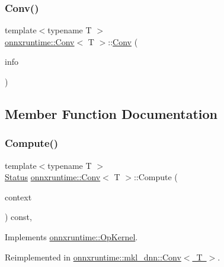 \subsubsection{\texorpdfstring{Conv()}{Conv()}}
{\footnotesize\ttfamily template$<$typename T $>$ \\
\mbox{\hyperlink{classonnxruntime_1_1Conv}{onnxruntime\+::\+Conv}}$<$ T $>$\+::\mbox{\hyperlink{classonnxruntime_1_1Conv}{Conv}} (\begin{DoxyParamCaption}\item[{const \mbox{\hyperlink{classonnxruntime_1_1OpKernelInfo}{Op\+Kernel\+Info}} \&}]{info }\end{DoxyParamCaption})\hspace{0.3cm}{\ttfamily [inline]}}



\subsection{Member Function Documentation}
\mbox{\label{classonnxruntime_1_1Conv_adb9e3e9c31f9c69cc510b7fb64a56f2e}} 
\subsubsection{\texorpdfstring{Compute()}{Compute()}\hspace{0.1cm}{\footnotesize\ttfamily [1/2]}}
{\footnotesize\ttfamily template$<$typename T $>$ \\
\mbox{\hyperlink{classonnxruntime_1_1common_1_1Status}{Status}} \mbox{\hyperlink{classonnxruntime_1_1Conv}{onnxruntime\+::\+Conv}}$<$ T $>$\+::Compute (\begin{DoxyParamCaption}\item[{\mbox{\hyperlink{classonnxruntime_1_1OpKernelContext}{Op\+Kernel\+Context}} $\ast$}]{context }\end{DoxyParamCaption}) const\hspace{0.3cm}{\ttfamily [override]}, {\ttfamily [virtual]}}



Implements \mbox{\hyperlink{classonnxruntime_1_1OpKernel_a9eca8656a78b1b3ab9d3351a12798650}{onnxruntime\+::\+Op\+Kernel}}.



Reimplemented in \mbox{\hyperlink{classonnxruntime_1_1mkl__dnn_1_1Conv_a8db02bc5e1f3cd5ac0935c7ff52dc935}{onnxruntime\+::mkl\+\_\+dnn\+::\+Conv$<$ T $>$}}.

